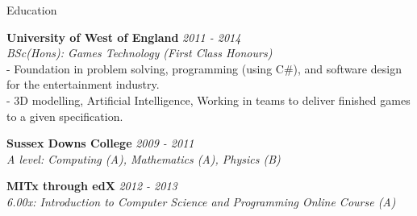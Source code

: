 \documentclass{resume} %
\begin{document}

\begin{rSection}{Education}

{\bf University of West of England } \hfill {\em 2011 - 2014} 
\\{ \textit {BSc(Hons): Games Technology (First Class Honours)  }} 
\\- Foundation in problem solving, programming (using C\#), and software design for the entertainment industry. 
\\- 3D modelling, Artificial Intelligence, Working in teams to deliver finished games to a given specification.

{\bf Sussex Downs College} \hfill {\em 2009 - 2011} 
\\ { \textit {A level: Computing (A), Mathematics (A), Physics (B)}} \hfill

{\bf MITx through edX} \hfill {\em 2012 - 2013} 
\\ { \textit {6.00x: Introduction to Computer Science and Programming Online Course (A)}}


\end{rSection}




\end{document}
